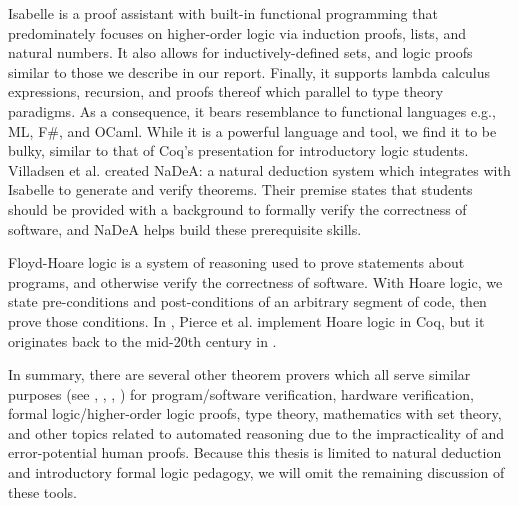 \documentclass[ms]{uncgdissertationexp2}
\theoremstyle{plain}
\theoremstyle{definition}
\theoremstyle{remark}
\begin{document}
Isabelle \cite{isabelle} is a proof assistant with built-in functional programming that predominately focuses on higher-order logic via induction proofs, lists, and natural numbers. It also allows for inductively-defined sets, and logic proofs similar to those we describe in our report. Finally, it supports lambda calculus expressions, recursion, and proofs thereof which parallel to type theory paradigms. As a consequence, it bears resemblance to functional languages e.g., ML, F\#, and OCaml. While it is a powerful language and tool, we find it to be bulky, similar to that of Coq's presentation for introductory logic students. Villadsen et al. \cite{villadsen} created NaDeA: a natural deduction system which integrates with Isabelle to generate and verify theorems. Their premise states that students should be provided with a background to formally verify the correctness of software, and NaDeA helps build these prerequisite skills.

Floyd-Hoare logic is a system of reasoning used to prove statements about programs, and otherwise verify the correctness of software. With Hoare logic, we state pre-conditions and post-conditions of an arbitrary segment of code, then prove those conditions. In \cite{softwarefoundations}, Pierce et al. implement Hoare logic in Coq, but it originates back to the mid-20th century in \cite{hoare}.

In summary, there are several other theorem provers which all serve similar purposes (see \cite{acl2}, \cite{alphaleantap}, \cite{pvs}, \cite{twelf}) for program/software verification, hardware verification, formal logic/higher-order logic proofs, type theory, mathematics with set theory, and other topics related to automated reasoning due to the impracticality of and error-potential human proofs. Because this thesis is limited to natural deduction and introductory formal logic pedagogy, we will omit the remaining discussion of these tools.
\end{document}
